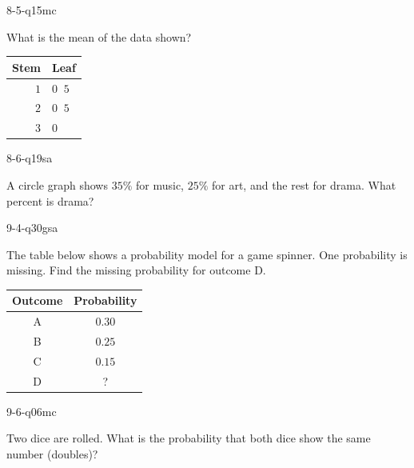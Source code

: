 \begin{practiceQuestion}{8-5-q15}{mc}
\begin{questionText}
What is the mean of the data shown?

\begin{center}
\begin{tabular}{r|l}
\textbf{Stem} & \textbf{Leaf} \\
\hline
$1$ & $0\;\;5$ \\
$2$ & $0\;\;5$ \\
$3$ & $0$
\end{tabular}
\end{center}
\end{questionText}
\end{practiceQuestion}

\begin{practiceQuestion}{8-6-q19}{sa}
\begin{questionText}
A circle graph shows $35\%$ for music, $25\%$ for art, and the rest for drama. What percent is drama?
\end{questionText}
\end{practiceQuestion}

\begin{practiceQuestion}{9-4-q30}{gsa}
\begin{questionText}
The table below shows a probability model for a game spinner. One probability is missing. Find the missing probability for outcome D.

\begin{center}
\begin{tabular}{|c|c|}
\hline
\textbf{Outcome} & \textbf{Probability} \\
\hline
A & $0.30$ \\
\hline
B & $0.25$ \\
\hline
C & $0.15$ \\
\hline
D & ? \\
\hline
\end{tabular}
\end{center}
\end{questionText}
\end{practiceQuestion}

\begin{practiceQuestion}{9-6-q06}{mc}
\begin{questionText}
Two dice are rolled. What is the probability that both dice show the same number (doubles)?
\end{questionText}
\end{practiceQuestion}

